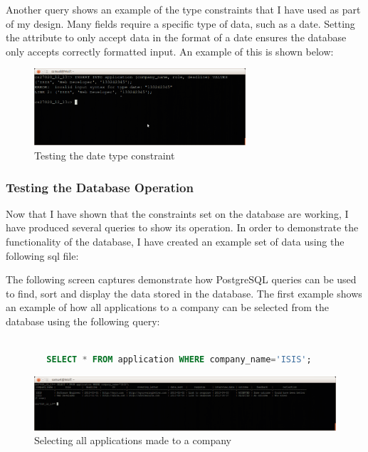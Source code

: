 \documentclass{article}
\begin{document}
Another query shows an example of the type constraints that I have used as part of my design. Many fields require a specific type of data, such as a date. Setting the attribute to only accept data in the format of a date ensures the database only accepts correctly formatted input. An example of this is shown below:

\begin{figure}[H]
\centering
\includegraphics[width=0.7\textwidth]{img/test/test-error-date.png}
\caption{Testing the date type constraint}
\label{fig:test-error-date}
\end{figure}

\subsubsection{Testing the Database Operation}
Now that I have shown that the constraints set on the database are working, I have produced several queries to show its operation. In order to demonstrate the functionality of the database, I have created an example set of data using the following sql file:



The following screen captures demonstrate how PostgreSQL queries can be used to find, sort and display the data stored in the database. The first example shows an example of how all applications to a company can be selected from the database using the following query:

\begin{center}
	\begin{lstlisting}[language=sql, showstringspaces=false]

		SELECT * FROM application WHERE company_name='ISIS';

	\end{lstlisting}
\end{center}

\begin{figure}[H]
\centering
\includegraphics[width=1\textwidth]{img/test/test-qapp.png}
\caption{Selecting all applications made to a company}
\label{fig:test-qapp}
\end{figure}
\end{document}
